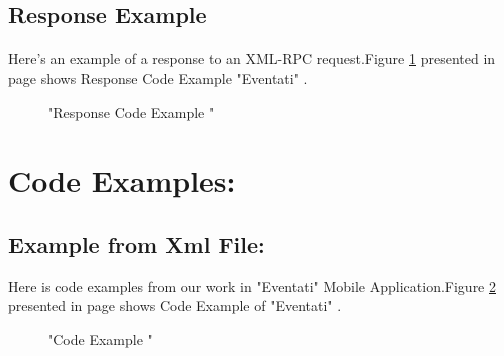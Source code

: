 \documentclass[12pt,a4paper,class,twoside,openany]{report}
\begin{document}
{\subsection{Response Example}
\paragraph*{\hspace{.9 cm} } Here's an example of a response to an XML-RPC request.Figure \ref{fg:7-5} presented in page \pageref{fg:7-5} shows Response Code Example "Eventati" .
\begin{figure}
\begin{center}
\caption{"Response Code Example  "}
\label{fg:7-5}
\end{center}
\end{figure}

\section{Code Examples:}
\subsection{Example from Xml File:}
Here is code examples from our work in "Eventati" Mobile Application.Figure \ref{fg:7-6} presented in page \pageref{fg:7-6} shows Code Example of "Eventati" .
\begin{figure}
\begin{center}
\caption{"Code Example  "}
\label{fg:7-6}
\end{center}
\end{figure}
 
}
\end{document}
